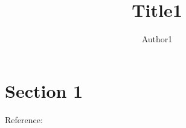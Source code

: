 \documentclass[a4paper,10pt]{article}
\title{Title1}
\author{Author1}
\begin{document}
\maketitle
\section{Section 1}
Reference: \cite{bibtexkey1}
\end{document}
